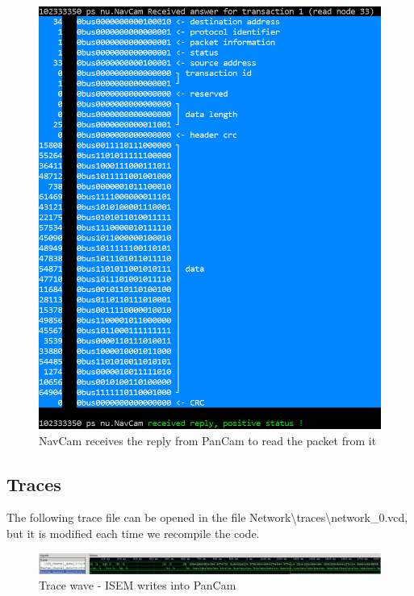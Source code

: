 \documentclass[12pt,a4paper]{article}
\begin{document}
\pagebreak

\begin{figure}[h]
	\centering
    \includegraphics[scale = 0.5]{results/NavCam_receives_reply_from_PanCam.png}
    \caption{NavCam receives the reply from PanCam to read the packet from it}
\end{figure}

\pagebreak

\subsection{Traces}

The following trace file can be opened in the file Network\textbackslash traces\textbackslash network\_0.vcd, but it is modified each time we recompile the code.

\smallbreak

\begin{figure}[h]
	\centering
    \includegraphics[scale = 0.3]{results/tracewave_12.png}
    \caption{Trace wave - ISEM writes into PanCam}
\end{figure}
\smallbreak
\end{document}
